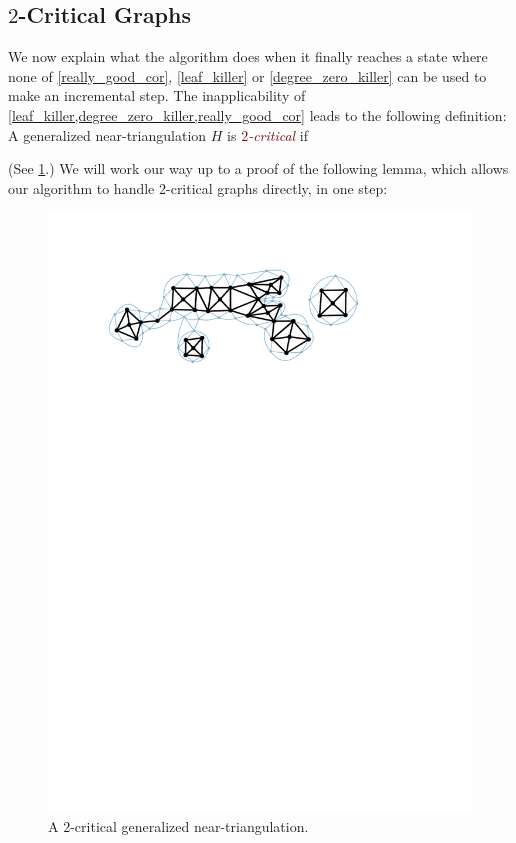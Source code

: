 \documentclass{article}
\newcommand{\defin}[1]{\emph{\textcolor{Maroon}{#1}}}
\theoremstyle{definition}
\begin{document}
\subsection{$2$-Critical Graphs}
\label{two_critical_section}

We now explain what the algorithm does when it finally reaches a state where  none of \cref{really_good_cor}, \cref{leaf_killer} or \cref{degree_zero_killer} can be used to make an incremental step.  The inapplicability of \cref{leaf_killer,degree_zero_killer,really_good_cor} leads to the following definition:
A generalized near-triangulation $H$ is \defin{$2$-critical} if
(See \cref{two_critical_figure}.) We will work our way up to a proof of the following lemma, which allows our algorithm to handle $2$-critical graphs directly, in one step:

\begin{figure}
  \centering
  \includegraphics[page=1]{figs/two_critical}
  \caption{A $2$-critical generalized near-triangulation.}
  \label{two_critical_figure}
\end{figure}
\end{document}
